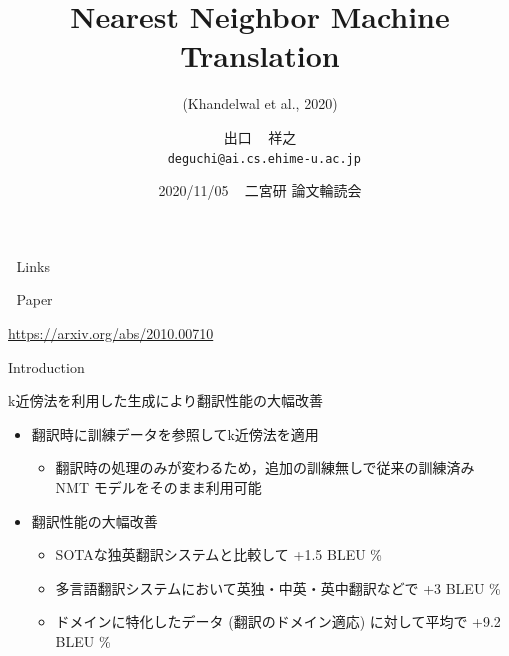 \documentclass[unicode, 12pt, xdvipdfmx, aspectratio=43]{beamer}
\author{出口 ~ 祥之 \\ \lower2.0pt\hbox{\materials} \texttt{deguchi@ai.cs.ehime-u.ac.jp}}
\date{2020/11/05 ~ 二宮研 論文輪読会}
\title{Nearest Neighbor Machine Translation}
\subtitle{(Khandelwal et al., 2020)}
\institute{}
\begin{document}
\maketitle

\begin{frame}[label={sec:org2fb6839}]{\hbox{\octicons} Links}
\begin{block}{\hbox{\octicons} Paper}
\begin{block}{\url{https://arxiv.org/abs/2010.00710}}
\end{block}
\end{block}
\end{frame}
\begin{frame}[label={sec:org8fc6652}]{Introduction}
\vspace{-0.2cm}
\begin{block}{k近傍法を利用した生成により翻訳性能の大幅改善}
\vspace{-0.2cm}
\small
\begin{itemize}
\item 翻訳時に訓練データを参照してk近傍法を適用 \vspace{-0.2cm}
\begin{itemize}
\item 翻訳時の処理のみが変わるため，追加の訓練無しで従来の訓練済み NMT モデルをそのまま利用可能
\end{itemize}
\item 翻訳性能の大幅改善
\begin{itemize}
\item SOTAな独英翻訳システムと比較して +1.5 BLEU \%
\item 多言語翻訳システムにおいて英独・中英・英中翻訳などで +3 BLEU \%
\item ドメインに特化したデータ (翻訳のドメイン適応) に対して平均で +9.2 BLEU \%
\end{itemize}
\end{itemize}
\end{block}
\end{frame}
\end{document}

